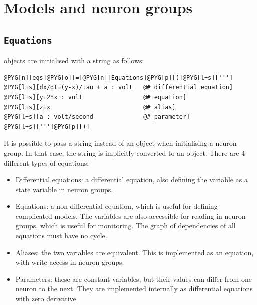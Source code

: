 \documentclass[letterpaper,10pt,english]{manual}
\begin{document}
\resetcurrentobjects
\hypertarget{--doc-models}{}

\section{Models and neuron groups}


\subsection{\texttt{Equations}}

\hyperlink{brian.Equations}{} objects are initialised with a string as follows:

\begin{Verbatim}[commandchars=@\[\]]
@PYG[n][eqs]@PYG[o][=]@PYG[n][Equations]@PYG[p][(]@PYG[l+s][''']
@PYG[l+s][dx/dt=(y-x)/tau + a : volt   @# differential equation]
@PYG[l+s][y=2*x : volt                 @# equation]
@PYG[l+s][z=x                          @# alias]
@PYG[l+s][a : volt/second              @# parameter]
@PYG[l+s][''']@PYG[p][)]
\end{Verbatim}
It is possible to pass a string instead of an \hyperlink{brian.Equations}{} object when initialising
a neuron group. In that case, the string is implicitly converted to an \hyperlink{brian.Equations}{} object.
There are 4 different types of equations:
\begin{itemize}
\item {} 
Differential equations: a differential equation, also defining the variable as a state
variable in neuron groups.

\item {} 
Equations: a non-differential equation, which is useful for defining complicated models.
The variables are also accessible for reading in neuron groups, which is useful for
monitoring. The graph of dependencies of all equations must have no cycle.

\item {} 
Aliases: the two variables are equivalent. This is implemented as an equation,
with write access in neuron groups.

\item {} 
Parameters: these are constant variables, but their values can differ from one neuron
to the next. They are implemented internally as differential equations with zero
derivative.

\end{itemize}
\end{document}
